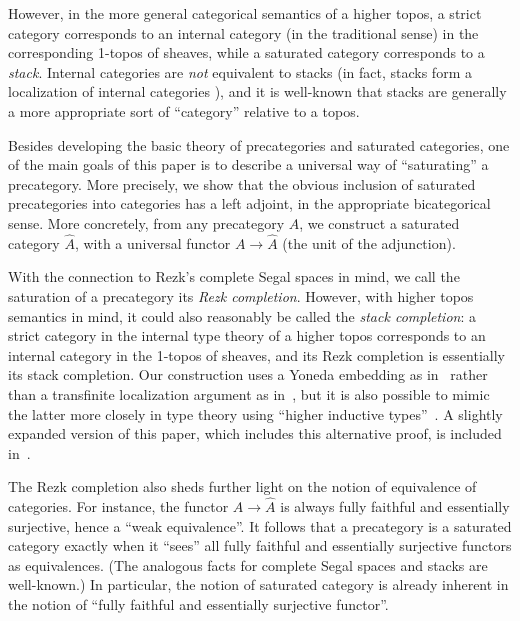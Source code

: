 \documentclass{mscs}
\numberwithin{equation}{section}
\begin{document}
However, in the more general categorical semantics of a higher topos, a strict category corresponds to an internal category (in the traditional sense) in the corresponding 1-topos of sheaves, while a saturated category corresponds to a \emph{stack}.
Internal categories are \emph{not} equivalent to stacks (in fact, stacks form a localization of internal categories \parencite{jt:strong-stacks}), and it is well-known that stacks are generally a more appropriate sort of ``category'' relative to a topos.

Besides developing the basic theory of precategories and saturated categories, one of the main goals of this paper is to describe a universal way of ``saturating'' a precategory.
More precisely, we show that the obvious inclusion of saturated precategories into categories has a left adjoint, in the appropriate bicategorical sense.
More concretely, from any precategory $A$, we construct a saturated category $\widehat{A}$, with a universal functor
$A \to \widehat{A}$ (the unit of the adjunction).

With the connection to Rezk's complete Segal spaces in mind, we call the saturation of a precategory its \emph{Rezk completion}.
However, with higher topos semantics in mind, it could also reasonably be called the \emph{stack completion}: a strict category in the internal type theory of a higher topos corresponds to an internal category in the 1-topos of sheaves, and its Rezk completion is essentially its stack completion.
Our construction uses a Yoneda embedding as in~\parencite{bunge:stacks-morita-internal} rather than a transfinite localization argument as in~\parencite{jt:strong-stacks,rezk01css}, but it is also possible to mimic the latter more closely in type theory using ``higher inductive types''~\parencite{ls:hits}.
A slightly expanded version of this paper, which includes this alternative proof, is included in~\parencite[Chapter 9]{HoTTbook}.

The Rezk completion also sheds further light on the notion of equivalence of categories.
For instance, the functor $A \to \widehat{A}$ is always fully faithful and essentially surjective, hence a ``weak equivalence''.
It follows that a precategory is a saturated category exactly when it ``sees'' all fully faithful and essentially surjective functors as equivalences.
(The analogous facts for complete Segal spaces and stacks are well-known.)
In particular, the notion of saturated category is already inherent in the notion of ``fully faithful and essentially surjective functor''.
\end{document}
